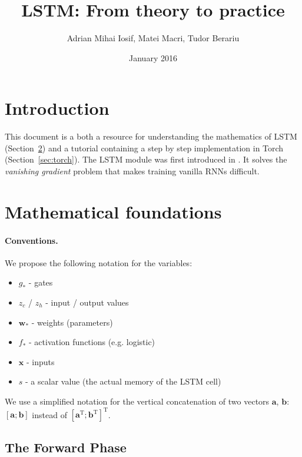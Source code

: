 \documentclass[11pt]{article}
\title{LSTM: From theory to practice}
\author{Adrian Mihai Iosif, Matei Macri, Tudor Berariu}
\date{January 2016}
\begin{document}
\maketitle

\section{Introduction}

This document is a both a resource for understanding the mathematics of LSTM (Section~\ref{sec:math}) and a tutorial containing a step by step implementation in Torch (Section~\ref{sec:torch}).
The LSTM module was first introduced in \cite{hochreiter1997long}. It solves the \emph{vanishing gradient} problem that makes training vanilla RNNs difficult.

\section{Mathematical foundations}
\label{sec:math}

\paragraph{Conventions.} We propose the following notation for the variables:
\begin{itemize}
    \item $g_{*}$ - gates
    \item $z_{c}$ / $z_h$ - input / output values
    \item $\mathbf{w}_{*}$ - weights (parameters)
    \item $f_{*}$ - activation functions (e.g. logistic)
    \item $\mathbf{x}$ - inputs
    \item $s$ - a scalar value (the actual memory of the LSTM cell)
\end{itemize}

We use a simplified notation for the vertical concatenation of two vectors $\mathbf{a}$, $\mathbf{b}$: $\left[\mathbf{a}; \mathbf{b}\right]$ instead of $\left[ \mathbf{a}^{\text{T}} ; \mathbf{b}^{\text{T}} \right]^{\text{T}}$.

\begin{center}

\end{center}

\subsection{The Forward Phase}
\end{document}
